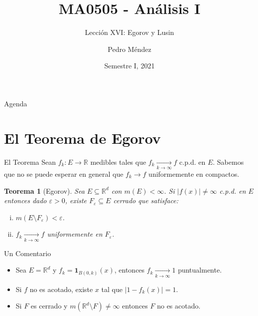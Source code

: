 \documentclass[utf8]{beamer}
\title[MA0505]{MA0505 - An\'alisis I}
\subtitle{Lecci\'on XVI: Egorov y Lusin}
\author{Pedro M\'endez\inst{1}}
\institute[Universidad de Costa Rica] %
{
  \inst{1}%
  Departmento de Matem\'atica Pura y Ciencias Actuariales\\
  Universidad de Costa Rica
  }
\date[I-2021] {Semestre I, 2021}
\theoremstyle{plain}
\newtheorem{Th}{Teorema}               %
\theoremstyle{definition}
\theoremstyle{remark}
\numberwithin{equation}{section}
\newcommand{\eps}{\varepsilon}          %
\newcommand{\bR}{\mathbb{R}}    %
\newcommand{\less}{\setminus}           %
\newcommand{\ind}{\mathbf{1}}       %
\renewcommand{\.}{\Cdot}                %
\begin{document}
\begin{frame}
  \titlepage
\end{frame}

\begin{frame}{Agenda}
  \tableofcontents
\end{frame}





\section{El Teorema de Egorov}

\begin{frame}{El Teorema}
  Sean $f_k:E\to\bR$ medibles tales que $f_k\xrightarrow[k\to\infty]{}f$ c.p.d. en $E$. Sabemos que no se puede esperar en general que $f_k\to f$ uniformemente en compactos.
  \begin{Th}[Egorov]\label{th:Egorov}
    Sea $E\subseteq\bR^d$ con $m(E)<\infty$. Si $|f(x)|\neq\infty$ c.p.d. en $E$ entonces dado $\eps>0$, existe $F_\eps\subseteq E$ cerrado que satisface:
    \begin{enumerate}[(i)]
      \item $m(E\less F_\eps)<\eps$.
      \item $f_k\xrightarrow[k\to\infty]{} f$ uniformemente en $F_\eps$.
    \end{enumerate}
  \end{Th}
\end{frame}

\begin{frame}{Un Comentario}
  \begin{itemize}
    \item Sea $E=\bR^d$ y $f_k=\ind_{B(0,k)}(x)$, entonces $f_k\xrightarrow[k\to\infty]{}1$ puntualmente.
    \item Si $f$ no es acotado, existe $x$ tal que $|1-f_k(x)|=1$.
    \item Si $F$ es cerrado y $m(\bR^d\less F)\neq\infty$ entonces $F$ no es acotado.
  \end{itemize}
\end{frame}
\end{document}
